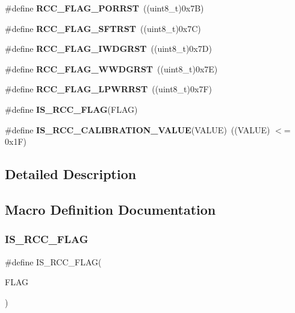 \begin{DoxyCompactItemize}
\#define {\bfseries R\+C\+C\+\_\+\+F\+L\+A\+G\+\_\+\+P\+O\+R\+R\+ST}~((uint8\+\_\+t)0x7\+B)
\item 
\mbox{\label{group___r_c_c___flag_gaf7852615e9b19f0b2dbc8d08c7594b52}} 
\#define {\bfseries R\+C\+C\+\_\+\+F\+L\+A\+G\+\_\+\+S\+F\+T\+R\+ST}~((uint8\+\_\+t)0x7\+C)
\item 
\mbox{\label{group___r_c_c___flag_gaac46bac8a97cf16635ff7ffc1e6c657f}} 
\#define {\bfseries R\+C\+C\+\_\+\+F\+L\+A\+G\+\_\+\+I\+W\+D\+G\+R\+ST}~((uint8\+\_\+t)0x7\+D)
\item 
\mbox{\label{group___r_c_c___flag_gaa80b60b2d497ccd7b7de1075009999a7}} 
\#define {\bfseries R\+C\+C\+\_\+\+F\+L\+A\+G\+\_\+\+W\+W\+D\+G\+R\+ST}~((uint8\+\_\+t)0x7\+E)
\item 
\mbox{\label{group___r_c_c___flag_ga67049531354aed7546971163d02c9920}} 
\#define {\bfseries R\+C\+C\+\_\+\+F\+L\+A\+G\+\_\+\+L\+P\+W\+R\+R\+ST}~((uint8\+\_\+t)0x7\+F)
\item 
\#define {\bfseries I\+S\+\_\+\+R\+C\+C\+\_\+\+F\+L\+AG}(F\+L\+AG)
\item 
\mbox{\label{group___r_c_c___flag_gafda50a08dc048f7c272bf04ec9c2c2b7}} 
\#define {\bfseries I\+S\+\_\+\+R\+C\+C\+\_\+\+C\+A\+L\+I\+B\+R\+A\+T\+I\+O\+N\+\_\+\+V\+A\+L\+UE}(V\+A\+L\+UE)~((V\+A\+L\+UE) $<$= 0x1\+F)
\end{DoxyCompactItemize}


\subsection{Detailed Description}


\subsection{Macro Definition Documentation}
\mbox{\label{group___r_c_c___flag_gaa27dea5bb62b26d0881e649770252158}} 
\subsubsection{\texorpdfstring{I\+S\+\_\+\+R\+C\+C\+\_\+\+F\+L\+AG}{IS\_RCC\_FLAG}}
{\footnotesize\ttfamily \#define I\+S\+\_\+\+R\+C\+C\+\_\+\+F\+L\+AG(\begin{DoxyParamCaption}\item[{}]{F\+L\+AG }\end{DoxyParamCaption})}

